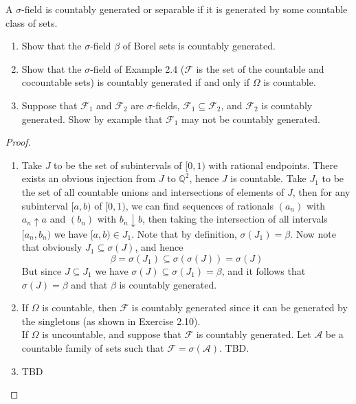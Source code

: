 \documentclass[11pt]{article}
\newcommand{\Q}{\mathbb{Q}}
\newcommand{\F}{\mathcal{F}}
\newcommand{\A}{\mathcal{A}}
\newcommand{\B}{\beta}
\newcommand{\seq}{\subseteq}
\newcommand{\Om}{\Omega}
\newenvironment{exercise}[2][Exercise]{\begin{trivlist}
\item[\hskip \labelsep {\bfseries #1}\hskip \labelsep {\bfseries #2.}]}{\end{trivlist}}
\begin{document}
\begin{exercise}{2.11}
    A $\sigma$-field is countably generated or separable if it is generated by some countable class of sets.
    \begin{enumerate}
        \item Show that the $\sigma$-field $\B$ of Borel sets is countably generated.
        \item Show that the $\sigma$-field of Example 2.4 ($\F$ is the set of the countable and cocountable sets) is countably generated if and only if $\Om$ is countable.
        \item Suppose that $\F_1$ and $\F_2$ are $\sigma$-fields, $\F_1 \seq \F_2$, and $\F_2$ is countably generated. Show by example that $\F_1$ may not be countably generated.
    \end{enumerate}
\end{exercise}
\begin{proof}
    \begin{enumerate}
        \item Take $J$ to be the set of subintervals of $[0, 1)$ with rational endpoints. There exists an obvious injection from $J$ to $\Q^2$, hence $J$ is countable.  Take $J_1$ to be the set of all countable unions and intersections of elements of $J$, then for any subinterval $[a, b)$ of $[0, 1)$, we can find sequences of rationals $(a_n)$ with $a_n \uparrow a$ and $(b_n)$ with $b_n \downarrow b$, then taking the intersection of all intervals $[a_n, b_n)$ we have $[a, b) \in J_1$. Note that by definition, $\sigma (J_1) = \B$. Now note that obviously $J_1 \seq \sigma (J)$, and hence 
        \[ \B = \sigma (J_1) \seq \sigma (\sigma (J)) = \sigma (J) \]
        But since $J \seq J_1$ we have $\sigma (J) \seq \sigma (J_1) = \B$, and it follows that $\sigma (J) = \B$ and that $\B$ is countably generated.
        \item If $\Om$ is countable, then $\F$ is countably generated since it can be generated by the singletons (as shown in Exercise 2.10). \\
        If $\Om$ is uncountable, and suppose that $\F$ is countably generated. Let $\A$ be a countable family of sets such that $\F = \sigma (\A)$. TBD.
        \item TBD
    \end{enumerate}
\end{proof}
\end{document}
